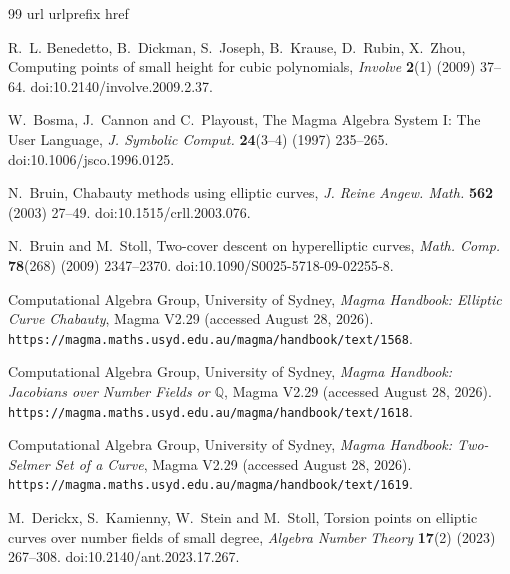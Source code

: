 \documentclass[11pt,a4paper]{amsart}
\theoremstyle{definition}
\theoremstyle{remark}
\numberwithin{equation}{section}
\newcommand{\Q}{\mathbb{Q}}
\begin{document}
\FloatBarrier
\begin{thebibliography}{99}
\expandafter\ifx\csname url\endcsname\relax
  \def\url#1{\texttt{#1}}\fi
\expandafter\ifx\csname urlprefix\endcsname\relax\def\urlprefix{URL }\fi
\expandafter\ifx\csname href\endcsname\relax
  \def\href#1#2{#2} \def\path#1{#1}\fi

R.~L. Benedetto, B.~Dickman, S.~Joseph, B.~Krause, D.~Rubin, X.~Zhou, Computing
  points of small height for cubic polynomials, \textit{Involve} \textbf{2}(1)
  (2009) 37--64.
\newblock \href{https://doi.org/10.2140/involve.2009.2.37}
  {\path{doi:10.2140/involve.2009.2.37}}.

W.~Bosma, J.~Cannon and C.~Playoust, The Magma Algebra System I: The User
  Language, \textit{J. Symbolic Comput.} \textbf{24}(3--4) (1997) 235--265.
\newblock \href{https://doi.org/10.1006/jsco.1996.0125}
  {\path{doi:10.1006/jsco.1996.0125}}.

N.~Bruin, Chabauty methods using elliptic curves, \textit{J. Reine Angew.
  Math.} \textbf{562} (2003) 27--49.
\newblock \href{https://doi.org/10.1515/crll.2003.076}
  {\path{doi:10.1515/crll.2003.076}}.

N.~Bruin and M.~Stoll, Two-cover descent on hyperelliptic curves,
  \textit{Math. Comp.} \textbf{78}(268) (2009) 2347--2370.
\newblock \href{https://doi.org/10.1090/S0025-5718-09-02255-8}
  {\path{doi:10.1090/S0025-5718-09-02255-8}}.

Computational Algebra Group, University of Sydney, \textit{Magma Handbook:
  Elliptic Curve Chabauty}, Magma V2.29 (accessed August 28, 2026).
\newblock \url{https://magma.maths.usyd.edu.au/magma/handbook/text/1568}.

Computational Algebra Group, University of Sydney, \textit{Magma Handbook:
  Jacobians over Number Fields or $\Q$}, Magma V2.29 (accessed August 28,
  2026).
\newblock \url{https://magma.maths.usyd.edu.au/magma/handbook/text/1618}.

Computational Algebra Group, University of Sydney, \textit{Magma Handbook:
  Two-Selmer Set of a Curve}, Magma V2.29 (accessed August 28, 2026).
\newblock \url{https://magma.maths.usyd.edu.au/magma/handbook/text/1619}.

M.~Derickx, S.~Kamienny, W.~Stein and M.~Stoll, Torsion points on elliptic
  curves over number fields of small degree, \textit{Algebra Number Theory}
  \textbf{17}(2) (2023) 267--308.
\newblock \href{https://doi.org/10.2140/ant.2023.17.267}
  {\path{doi:10.2140/ant.2023.17.267}}.


\end{thebibliography}
\end{document}

